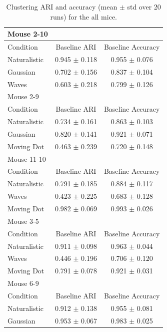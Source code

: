 \documentclass[11pt]{article}
\begin{document}
\begin{table}[h]
\centering
\small
\begin{tabular}{lcc}
\toprule
Mouse \textsf{2-10} & & \\
\toprule
Condition & Baseline ARI & Baseline Accuracy \\
\midrule
  Naturalistic & 0.945 $\pm$ 0.118 & 0.955 $\pm$ 0.076  \\
  Gaussian & 0.702 $\pm$ 0.156 & 0.837 $\pm$ 0.104\\
  Waves & 0.603 $\pm$ 0.218 & 0.799 $\pm$ 0.126  \\
\bottomrule
\toprule
Mouse \textsf{2-9} & & \\
\toprule
Condition & Baseline ARI & Baseline Accuracy \\
\midrule
  Naturalistic & 0.734 $\pm$ 0.161 & 0.863 $\pm$ 0.103  \\
  Gaussian & 0.820 $\pm$ 0.141 & 0.921 $\pm$ 0.071\\
  Moving Dot & 0.463 $\pm$ 0.239 & 0.720 $\pm$ 0.148  \\
\bottomrule
\toprule
Mouse \textsf{11-10} & & \\
\toprule
Condition & Baseline ARI & Baseline Accuracy \\
\midrule
  Naturalistic & 0.791 $\pm$ 0.185 & 0.884 $\pm$ 0.117  \\
  Waves & 0.423 $\pm$ 0.225 & 0.683 $\pm$ 0.128  \\
  Moving Dot & 0.982 $\pm$ 0.069 & 0.993 $\pm$ 0.026  \\
\bottomrule
\toprule
Mouse \textsf{3-5} & &\\
\bottomrule
Condition & Baseline ARI & Baseline Accuracy \\
\midrule
  Naturalistic & 0.911 $\pm$ 0.098 & 0.963 $\pm$ 0.044  \\
  Waves & 0.446 $\pm$ 0.196 & 0.706 $\pm$ 0.120  \\
  Moving Dot & 0.791 $\pm$ 0.078 & 0.921 $\pm$ 0.031  \\
\bottomrule
\toprule
Mouse \textsf{6-9} & & \\
\bottomrule
Condition & Baseline ARI & Baseline Accuracy \\
\midrule
  Naturalistic & 0.912 $\pm$ 0.138 & 0.955 $\pm$ 0.081  \\
  Gaussian & 0.953 $\pm$ 0.067 & 0.983 $\pm$ 0.025\\
\bottomrule
\end{tabular}
\caption{Clustering ARI and accuracy (mean $\pm$ std over 20 runs) for the all mice.}
\label{tab:allmice}
\end{table}
\end{document}
